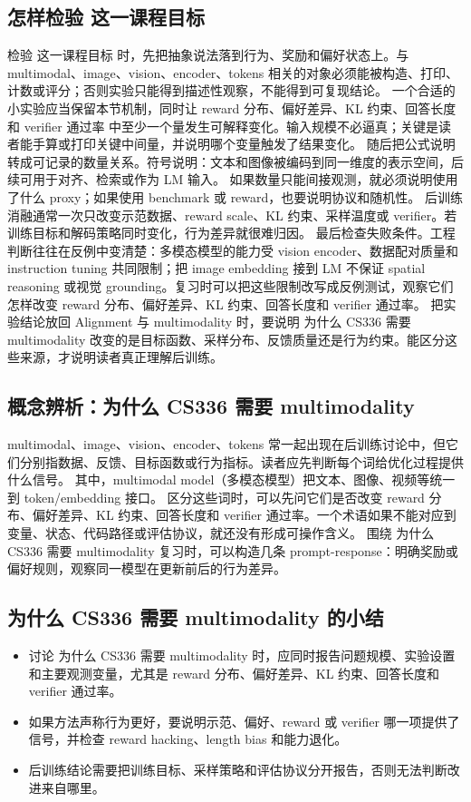 \documentclass[a4paper]{article}
\begin{document}
\subsection{怎样检验 这一课程目标}
检验 这一课程目标 时，先把抽象说法落到行为、奖励和偏好状态上。与 multimodal、image、vision、encoder、tokens 相关的对象必须能被构造、打印、计数或评分；否则实验只能得到描述性观察，不能得到可复现结论。
一个合适的小实验应当保留本节机制，同时让 reward 分布、偏好差异、KL 约束、回答长度和 verifier 通过率 中至少一个量发生可解释变化。输入规模不必逼真；关键是读者能手算或打印关键中间量，并说明哪个变量触发了结果变化。
随后把公式说明转成可记录的数量关系。符号说明：文本和图像被编码到同一维度的表示空间，后续可用于对齐、检索或作为 LM 输入。 如果数量只能间接观测，就必须说明使用了什么 proxy；如果使用 benchmark 或 reward，也要说明协议和随机性。
后训练消融通常一次只改变示范数据、reward scale、KL 约束、采样温度或 verifier。若训练目标和解码策略同时变化，行为差异就很难归因。
最后检查失败条件。工程判断往往在反例中变清楚：多模态模型的能力受 vision encoder、数据配对质量和 instruction tuning 共同限制；把 image embedding 接到 LM 不保证 spatial reasoning 或视觉 grounding。复习时可以把这些限制改写成反例测试，观察它们怎样改变 reward 分布、偏好差异、KL 约束、回答长度和 verifier 通过率。
把实验结论放回 Alignment 与 multimodality 时，要说明 为什么 CS336 需要 multimodality 改变的是目标函数、采样分布、反馈质量还是行为约束。能区分这些来源，才说明读者真正理解后训练。
\subsection{概念辨析：为什么 CS336 需要 multimodality}
multimodal、image、vision、encoder、tokens 常一起出现在后训练讨论中，但它们分别指数据、反馈、目标函数或行为指标。读者应先判断每个词给优化过程提供什么信号。
其中，multimodal model（多模态模型）把文本、图像、视频等统一到 token/embedding 接口。
区分这些词时，可以先问它们是否改变 reward 分布、偏好差异、KL 约束、回答长度和 verifier 通过率。一个术语如果不能对应到变量、状态、代码路径或评估协议，就还没有形成可操作含义。
围绕 为什么 CS336 需要 multimodality 复习时，可以构造几条 prompt-response：明确奖励或偏好规则，观察同一模型在更新前后的行为差异。
\subsection{为什么 CS336 需要 multimodality 的小结}
\begin{itemize}
\item 讨论 为什么 CS336 需要 multimodality 时，应同时报告问题规模、实验设置和主要观测变量，尤其是 reward 分布、偏好差异、KL 约束、回答长度和 verifier 通过率。
\item 如果方法声称行为更好，要说明示范、偏好、reward 或 verifier 哪一项提供了信号，并检查 reward hacking、length bias 和能力退化。
\item 后训练结论需要把训练目标、采样策略和评估协议分开报告，否则无法判断改进来自哪里。
\end{itemize}
\end{document}
